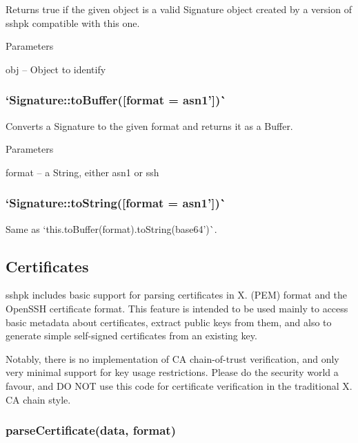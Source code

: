 Returns {\ttfamily true} if the given object is a valid {\ttfamily Signature} object created by a version of {\ttfamily sshpk} compatible with this one.

Parameters


\begin{DoxyItemize}
\item {\ttfamily obj} -- Object to identify
\end{DoxyItemize}

\subsubsection*{`Signature\+::to\+Buffer(\mbox{[}format = \textquotesingle{}asn1'\mbox{]})\`{}}

Converts a Signature to the given format and returns it as a Buffer.

Parameters


\begin{DoxyItemize}
\item {\ttfamily format} -- a String, either {\ttfamily asn1} or {\ttfamily ssh}
\end{DoxyItemize}

\subsubsection*{`Signature\+::to\+String(\mbox{[}format = \textquotesingle{}asn1'\mbox{]})\`{}}

Same as `this.\+to\+Buffer(format).to\+String(\textquotesingle{}base64')\`{}.

\subsection*{Certificates}

{\ttfamily sshpk} includes basic support for parsing certificates in X. (P\+EM) format and the Open\+S\+SH certificate format. This feature is intended to be used mainly to access basic metadata about certificates, extract public keys from them, and also to generate simple self-\/signed certificates from an existing key.

Notably, there is no implementation of CA chain-\/of-\/trust verification, and only very minimal support for key usage restrictions. Please do the security world a favour, and DO N\+OT use this code for certificate verification in the traditional X. CA chain style.

\subsubsection*{{\ttfamily parse\+Certificate(data, format)}}

